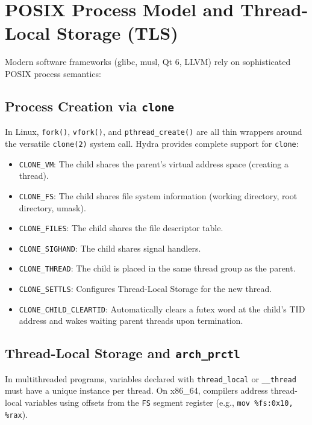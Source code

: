 \section{POSIX Process Model and Thread-Local Storage (TLS)}
\label{sec:posix_model}

Modern software frameworks (glibc, musl, Qt 6, LLVM) rely on sophisticated POSIX process semantics:

\subsection{Process Creation via \texttt{clone}}
In Linux, \texttt{fork()}, \texttt{vfork()}, and \texttt{pthread\_create()} are all thin wrappers around the versatile \texttt{clone(2)} system call. Hydra provides complete support for \texttt{clone}:
\begin{itemize}
    \item \texttt{CLONE\_VM}: The child shares the parent's virtual address space (creating a thread).
    \item \texttt{CLONE\_FS}: The child shares file system information (working directory, root directory, umask).
    \item \texttt{CLONE\_FILES}: The child shares the file descriptor table.
    \item \texttt{CLONE\_SIGHAND}: The child shares signal handlers.
    \item \texttt{CLONE\_THREAD}: The child is placed in the same thread group as the parent.
    \item \texttt{CLONE\_SETTLS}: Configures Thread-Local Storage for the new thread.
    \item \texttt{CLONE\_CHILD\_CLEARTID}: Automatically clears a futex word at the child's TID address and wakes waiting parent threads upon termination.
\end{itemize}

\subsection{Thread-Local Storage and \texttt{arch\_prctl}}
In multithreaded programs, variables declared with \texttt{thread\_local} or \texttt{\_\_thread} must have a unique instance per thread. On x86\_64, compilers address thread-local variables using offsets from the \texttt{FS} segment register (e.g., \texttt{mov \%fs:0x10, \%rax}).

